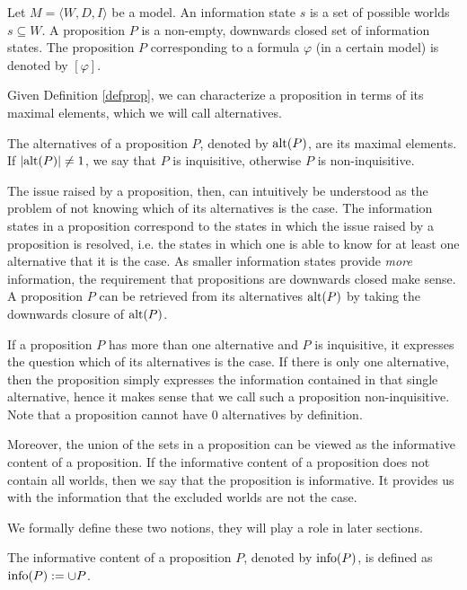 \begin{defi}\label{defprop}
 Let $M=\langle W,D,I\rangle$ be a model. An information state $s$ is a set of possible worlds $s\subseteq W$. A proposition $P$ is a non-empty, downwards closed set of information states. The proposition $P$ corresponding to a formula $\varphi$ (in a certain model) is denoted by $[\varphi]$.
\end{defi}

Given Definition \ref{defprop}, we can characterize a proposition in terms of its maximal elements, which we will call alternatives. 

\begin{defi}
 The alternatives of a proposition $P$, denoted by $\textrm{alt}(P)$, are its maximal elements. If $|\textrm{alt}(P)|\neq 1$, we say that $P$ is inquisitive, otherwise $P$ is non-inquisitive.
\end{defi}

The issue raised by a proposition, then, can intuitively be understood as the problem of not knowing which of its alternatives is the case. The information states in a proposition correspond to the states in which the issue raised by a proposition is resolved, i.e. the states in which one is able to know for at least one alternative that it is the case. As smaller information states provide \emph{more} information, the requirement that propositions are downwards closed make sense. A proposition $P$ can be retrieved from its alternatives $\textrm{alt}(P)$ by taking the downwards closure of $\textrm{alt}(P)$.

If a proposition $P$ has more than one alternative and $P$ is inquisitive, it expresses the question which of its alternatives is the case. If there is only one alternative, then the proposition simply expresses the information contained in that single alternative, hence it makes sense that we call such a proposition non-inquisitive. Note that a proposition cannot have $0$ alternatives by definition.

Moreover, the union of the sets in a proposition can be viewed as the informative content of a proposition. If the informative content of a proposition does not contain all worlds, then we say that the proposition is informative. It provides us with the information that the excluded worlds are not the case. 

We formally define these two notions, they will play a role in later sections.

\begin{defi}
 The informative content of a proposition $P$, denoted by $\textrm{info}(P)$, is defined as $\textrm{info}(P):=\cup P$.
\end{defi}


